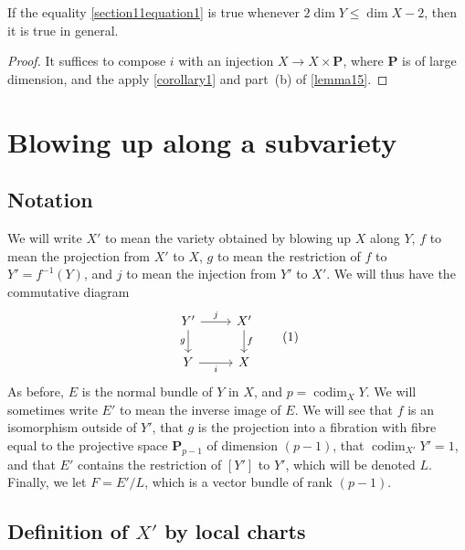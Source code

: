 \documentclass{article}
\theoremstyle{plain}
\newenvironment{cor}[1]
    {\renewcommand\theinnercustomcor{#1}\innercustomcor}
    {\endinnercustomcor}
\theoremstyle{definition}
\newcommand{\PP}{\mathbf{P}}
\renewcommand{\leq}{\leqslant}
\DeclareMathOperator{\codim}{codim}
\newcommand{\oldpage}[1]{\marginpar{\footnotesize$\Big\vert$ \textit{p.~#1}}}
\begin{document}
\begin{cor}{2}
\label{corollary2}
  If the equality \cref{section11equation1} is true whenever $2\dim Y\leq\dim X-2$, then it is true in general.
\end{cor}

\begin{proof}
  It suffices to compose $i$ with an injection $X\to X\times\PP$, where $\PP$ is of large dimension, and the apply \cref{corollary1} and part~(b) of \cref{lemma15}.
\end{proof}


\section{Blowing up along a subvariety}
\label{section12}


\subsection{Notation}
\label{section12a}

We will write $X'$ to mean the variety obtained by blowing up $X$ along $Y$, $f$ to mean the projection from $X'$ to $X$, $g$ to mean the restriction of $f$ to $Y'=f^{-1}(Y)$, and $j$ to mean the injection from $Y'$ to $X'$.
We will thus have the commutative diagram
\[
\label{section12aequation1}
  \begin{tikzcd}
    Y' \rar["j"] \dar[swap,"g"]
    & X' \dar["f"]
  \\ Y \rar[swap,"i"]
    & X
  \end{tikzcd}
  \tag{1}
\]
As before, $E$ is the normal bundle of $Y$ in $X$, and $p=\codim_XY$.
We will sometimes write $E'$ to mean the inverse image of $E$.
We will see that $f$ is an isomorphism outside of $Y'$, that $g$ is the projection into a fibration
\oldpage{126}
with fibre equal to the projective space $\PP_{p-1}$ of dimension $(p-1)$, that $\codim_{X'}Y'=1$, and that $E'$ contains the restriction of $[Y']$ to $Y'$, which will be denoted $L$.
Finally, we let $F=E'/L$, which is a vector bundle of rank $(p-1)$.


\subsection{Definition of \texorpdfstring{$X'$}{X'} by local charts}
\label{subsection12b}
\end{document}
